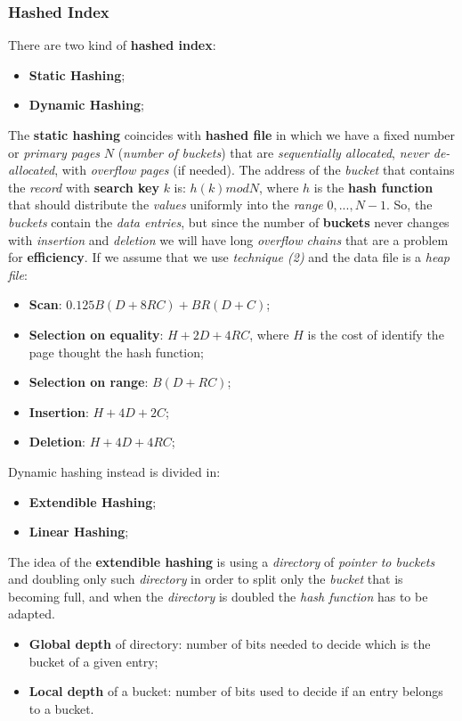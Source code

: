 \documentclass{article}
\begin{document}
\subsubsection{Hashed Index}
There are two kind of \textbf{hashed index}:
\begin{itemize}
\item \textbf{Static Hashing};
\item \textbf{Dynamic Hashing};
\end{itemize}
The \textbf{static hashing} coincides with \textbf{hashed file} in which we have a fixed number or \emph{primary pages} $N$ (\emph{number of buckets}) that are \emph{sequentially allocated}, \emph{never de-allocated}, with \emph{overflow pages} (if needed). The address of the \emph{bucket} that contains the \emph{record} with \textbf{search key} $k$ is: $h(k) mod N$, where $h$ is the \textbf{hash function} that should distribute the \emph{values} uniformly into the \emph{range} $0, ... , N-1$. So, the \emph{buckets} contain the \emph{data entries}, but since the number of \textbf{buckets} never changes with \emph{insertion} and \emph{deletion} we will have long \emph{overflow chains} that are a problem for \textbf{efficiency}. If we assume that we use \emph{technique (2) }and the data file is a \emph{heap file}:
\begin{itemize}
\item \textbf{Scan}: $0.125B(D+8RC) + BR(D+C)$;
\item \textbf{Selection on equality}: $H + 2D +  4RC$, where $H$ is the cost of identify the page thought the hash function;
\item \textbf{Selection on range}: $B(D+RC)$;
\item \textbf{Insertion}: $H+ 4D + 2C$;
\item \textbf{Deletion}: $H+ 4D + 4RC$;
\end{itemize}
Dynamic hashing instead is divided in:
\begin{itemize}
\item \textbf{Extendible Hashing};
\item \textbf{Linear Hashing};
\end{itemize}
The idea of the \textbf{extendible hashing} is using a \emph{directory} of \emph{pointer to buckets} and doubling only such \emph{directory} in order to split only the \emph{bucket} that is becoming full, and when the \emph{directory} is doubled the \emph{hash function} has to be adapted. 
\begin{itemize}
\item \textbf{Global depth} of directory: number of bits needed to decide which is the bucket of a given entry;
\item \textbf{Local depth} of a bucket: number of bits used to decide if an entry belongs to a bucket. 
\end{itemize}
\end{document}
